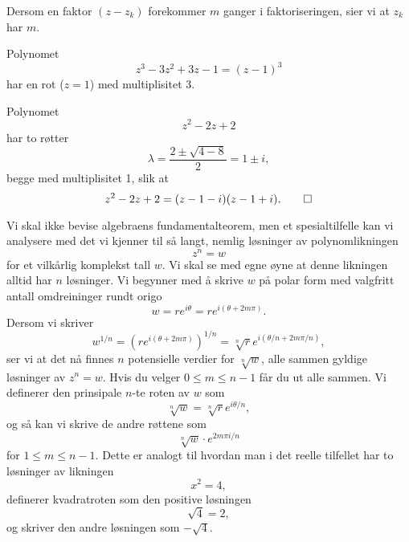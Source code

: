 Dersom en faktor $(z-z_k)$  forekommer $m$ ganger i faktoriseringen, 
sier vi at $z_k$ har  $m$.
\begin{ex}
Polynomet 
\[
z^3-3z^2+3z-1=(z-1)^3
\]
har en rot ($z=1$) med multiplisitet 3.
\end{ex}

\begin{ex}
Polynomet 
\[
z^2-2z+2
\]
har to røtter 
\[
\lambda=\frac{2\pm\sqrt{4-8}}{2}=1\pm i,
\] 
begge med multiplisitet 1, slik at 
\[
z^2-2z+2=(z-1-i)(z-1+i).\qedhere
\]
\end{ex}


Vi skal ikke bevise algebraens fundamentalteorem,
men et spesialtilfelle kan vi analysere med det vi kjenner til så langt, 
nemlig løsninger av polynomlikningen
\[
z^n=w
\]
for et vilkårlig komplekst tall $w$. 
Vi skal se med egne øyne at denne likningen alltid har $n$ løsninger. 
Vi begynner med å skrive $w$ på polar form med valgfritt antall omdreininger rundt origo
\[
w = re^{i \theta}=re^{i (\theta+2m\pi)}.
\]
Dersom vi skriver 
\[
w^{1/n} = (re^{i (\theta+2m\pi)})^{1/n}=\sqrt[n]{r}e^{i (\theta/n+2m\pi/n)},
\]
ser vi at det nå finnes $n$ potensielle verdier for $\sqrt[n]{w}$, alle sammen gyldige løsninger av $z^n=w$. 
Hvis du velger $0\leq m \leq n-1$ får du ut alle sammen. 
Vi definerer den prinsipale $n$-te roten av $w$ som
\[
\sqrt[n]{w} = \sqrt[n]{r}e^{i \theta/n},
\]
og så kan vi skrive de andre røttene som 
\[
\sqrt[n]{w} \cdot e^{2m\pi i/n}
\]
for $1 \leq m\leq n-1$.
Dette er analogt til hvordan man i det reelle tilfellet har to løsninger av likningen
\[
x^2=4,
\]
definerer kvadratroten som den positive løsningen
\[
\sqrt{4}=2,
\]
og skriver den andre løsningen som $-\sqrt{4}$.



